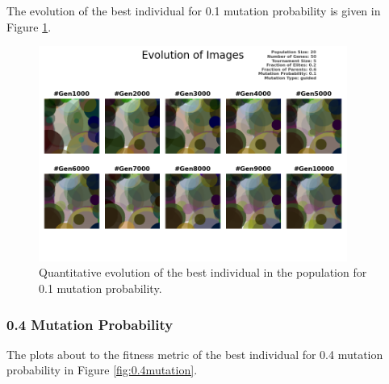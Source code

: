 \documentclass{assignment}
\begin{document}
The evolution of the best individual for 0.1 mutation probability is given in Figure \ref{fig:0.1mutation_image}.
\begin{figure}[!htb]
    \centering
    \includegraphics[width=0.9\textwidth]{figures/images_output_20_50_5_0.2_0.6_0.1_guided.png}
    \caption{Quantitative evolution of the best individual in the population for 0.1 mutation probability.}
    \label{fig:0.1mutation_image}
\end{figure}

\subsubsection{0.4 Mutation Probability}
The plots about to the fitness metric of the best individual for 0.4 mutation probability in Figure \ref{fig:0.4mutation}.
\end{document}

